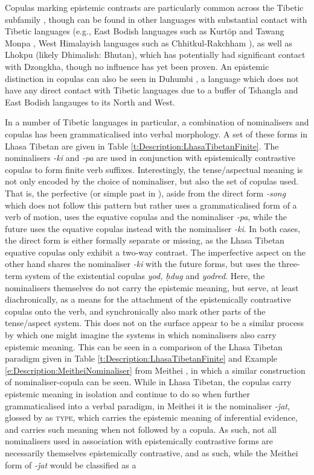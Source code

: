 Copulas marking epistemic contrasts are particularly common across the Tibetic subfamily \cite{Zemp2020}, though can be found in other languages with substantial contact with Tibetic languages (e.g., East Bodish languages such as Kurtöp \cite{Hyslop2020Kurtop} and Tawang Monpa \cite{Tombleson2020}, West Himalayish languages such as Chhitkul-Rakchham \cite{Martinez2021}), as well as Lhokpu (likely Dhimalish: Bhutan), which has potentially had significant contact with Dzongkha, though no influence has yet been proven. An epistemic distinction in copulas can also be seen in Duhumbi \cite[Duhumbi: Kho-Bwa,][]{Bodt2020}, a language which does not have any direct contact with Tibetic languages due to a buffer of Tshangla and East Bodish langauges to its North and West.

In a number of Tibetic languages in particular, a combination of nominalisers and copulas has been grammaticalised into verbal morphology. A set of these forms in Lhasa Tibetan are given in Table \ref{t:Description:LhasaTibetanFinite}. The nominalisers \textit{-ki} and \textit{-pa} are used in conjunction with epistemically contrastive copulas to form finite verb suffixes. Interestingly, the tense/aspectual meaning is not only encoded by the choice of nominaliser, but also the set of copulas used. That is, the perfective (or simple past in ), aside from the direct form \textit{-song} which does not follow this pattern but rather uses a grammaticalised form of a verb of motion, uses the equative copulas and the nominaliser \textit{-pa}, while the future uses the equative copulas instead with the nominaliser \textit{-ki}. In both cases, the direct form is either formally separate or missing, as the Lhasa Tibetan equative copulas only exhibit a two-way contrast. The imperfective aspect on the other hand shares the nominaliser \textit{-ki} with the future forms, but uses the three-term system of the existential copulas \textit{yod, ḥdug} and \textit{yodred}. Here, the nominalisers themselves do not carry the epistemic meaning, but serve, at least diachronically, as a means for the attachment of the epistemically contrastive copulas onto the verb, and synchronically also mark other parts of the tense/aspect system. This does not on the surface appear to be a similar process by which one might imagine the systems in which nominalisers also carry epistemic meaning. This can be seen in a comparison of the Lhasa Tibetan paradigm given in Table \ref{t:Description:LhasaTibetanFinite} and Example \ref{e:Description:MeitheiNominaliser} from Meithei \cite[Internal Isolate: India,][296]{Chelliah1997}, in which a similar construction of nominaliser-copula can be seen. While in Lhasa Tibetan, the copulas carry epistemic meaning in isolation and continue to do so when further grammaticalised into a verbal paradigm, in Meithei it is the nominaliser \textit{-ǰat}, glossed by  as \textsc{type}, which carries the epistemic meaning of inferential evidence, and carries such meaning when not followed by a copula. As such, not all nominalisers used in association with epistemically contrastive forms are necessarily themselves epistemically contrastive, and as such, while the Meithei form of \textit{-ǰat} would be classified as a 